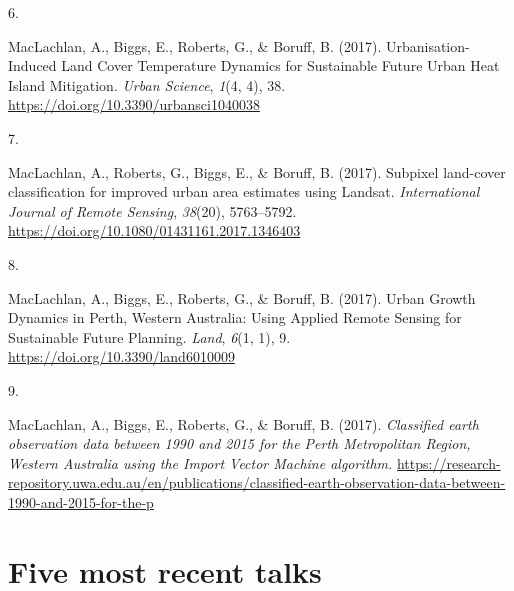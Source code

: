 \documentclass[11pt,a4paper,]{moderncv}
\newlength{\cslhangindent}
\newlength{\csllabelwidth}
\newenvironment{CSLReferences}[2] %
 {\begin{list}{}{%
  \setlength{\itemindent}{0pt}
  \setlength{\leftmargin}{0pt}
  \setlength{\parsep}{0pt}
  \ifodd #1
   \setlength{\leftmargin}{\cslhangindent}
   \setlength{\itemindent}{-1\cslhangindent}
  \fi
  \setlength{\itemsep}{#2\baselineskip}}}
 {\end{list}}
\newcommand{\CSLLeftMargin}[1]{\parbox[t]{\csllabelwidth}{\strut#1\strut}}
\newcommand{\CSLRightInline}[1]{\parbox[t]{\linewidth - \csllabelwidth}{\strut#1\strut}}
\begin{document}
\begin{CSLReferences}{0}{0}
\CSLLeftMargin{6. }%
\CSLRightInline{MacLachlan, A., Biggs, E., Roberts, G., \& Boruff, B.
(2017). Urbanisation-Induced Land Cover Temperature Dynamics for
Sustainable Future Urban Heat Island Mitigation. \emph{Urban Science},
\emph{1}(4, 4), 38. \url{https://doi.org/10.3390/urbansci1040038}}

\CSLLeftMargin{7. }%
\CSLRightInline{MacLachlan, A., Roberts, G., Biggs, E., \& Boruff, B.
(2017). Subpixel land-cover classification for improved urban area
estimates using Landsat. \emph{International Journal of Remote Sensing},
\emph{38}(20), 5763--5792.
\url{https://doi.org/10.1080/01431161.2017.1346403}}

\CSLLeftMargin{8. }%
\CSLRightInline{MacLachlan, A., Biggs, E., Roberts, G., \& Boruff, B.
(2017). Urban Growth Dynamics in Perth, Western Australia: Using Applied
Remote Sensing for Sustainable Future Planning. \emph{Land}, \emph{6}(1,
1), 9. \url{https://doi.org/10.3390/land6010009}}

\CSLLeftMargin{9. }%
\CSLRightInline{MacLachlan, A., Biggs, E., Roberts, G., \& Boruff, B.
(2017). \emph{Classified earth observation data between 1990 and 2015
for the Perth Metropolitan Region, Western Australia using the Import
Vector Machine algorithm.}
\url{https://research-repository.uwa.edu.au/en/publications/classified-earth-observation-data-between-1990-and-2015-for-the-p}}

\end{CSLReferences}

\section{Five most recent talks}\label{five-most-recent-talks}
\end{document}
